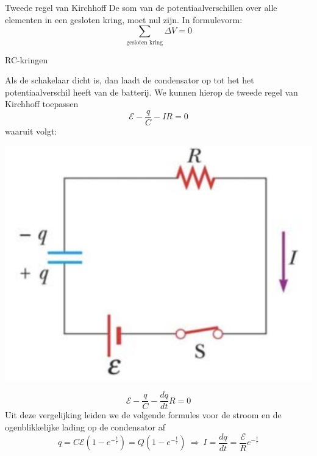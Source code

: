 \begin{theo}{Tweede regel van Kirchhoff}
    De som van de potentiaalverschillen over alle elementen in een gesloten kring, moet nul zijn. In formulevorm:
    \begin{equation*}
        \sum_{\text{gesloten kring}} \Delta V = 0
    \end{equation*}
    \vspace{-0.4cm}
\end{theo}

\newpage

\begin{app}[RC-kringen]{RC-kringen}
    \vspace{-0.3cm}
    \begin{minipage}{.73\textwidth}
        Als de schakelaar dicht is, dan laadt de condensator op tot het het potentiaalverschil heeft van de batterij.
        We kunnen hierop de tweede regel van Kirchhoff toepassen
        \begin{equation*}
            \mathcal{E} - \dfrac{q}{C} - IR = 0
        \end{equation*}
        waaruit volgt:
    \end{minipage}
    \begin{minipage}{.25\textwidth}
       \includegraphics[scale = 0.15]{Images/Elektriciteit/RC-kring.png}
    \end{minipage}
    \vspace{-0.5cm}
    \begin{equation*}
        \mathcal{E} - \dfrac{q}{C} - \frac{dq}{dt}R = 0
    \end{equation*}
    \noindent Uit deze vergelijking leiden we de volgende formules voor de stroom en de ogenblikkelijke lading op de condensator af
    \begin{equation*}
        q = C\mathcal{E}(1-e^{-\tfrac{t}{\tau}})= Q(1-e^{-\tfrac{t}{\tau}}) \ \Rightarrow \ I = \dfrac{dq}{dt} = \dfrac{\mathcal{E}}{R}e^{-\tfrac{t}{\tau}}
    \end{equation*}


\end{app}
